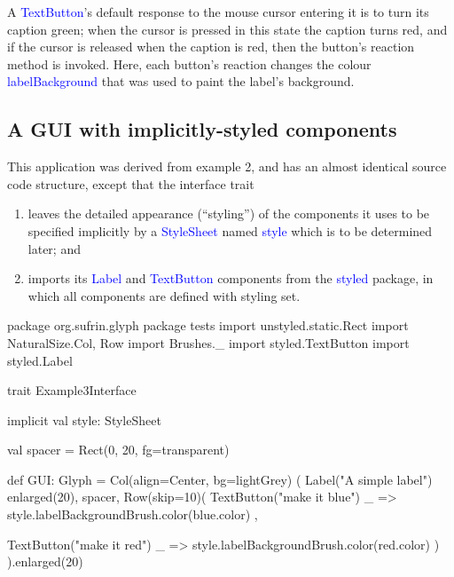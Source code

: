 \documentclass[12pt,a4paper]{article}
\def\Scala#1{\textcolor{blue}{\textsf{#1}}}
\def\SS#1{\subsection{#1}}
\begin{document}
A \Scala{TextButton}'s default response to the mouse cursor entering
it is to turn its caption green; when the cursor is pressed in this
state the caption turns red, and if the cursor is released when the
caption is red, then the button's reaction method is invoked. Here,
each button's reaction changes the colour \Scala{labelBackground} that
was used to paint the label's background.

\begin{center}
\end{center}


\clearpage
\SS{A GUI with implicitly-styled components}

This application was derived from example 2, and has an almost
identical source code structure, except that the interface trait
\begin{enumerate}
\item leaves the detailed appearance (``styling'') of the
      components it uses to be specified implicitly by a
      \Scala{StyleSheet} named \Scala{style}
      which is to be determined later; and
\item imports its \Scala{Label} and \Scala{TextButton}
      components from the \Scala{styled} package, in which
      all components are defined with styling set. 
\end{enumerate}

\begin{scala}
package org.sufrin.glyph
package tests
import unstyled.static.Rect
import NaturalSize.{Col, Row}
import Brushes._
import styled.TextButton
import styled.Label
\end{scala}

\begin{scala}
trait Example3Interface {
  implicit val style: StyleSheet

  val spacer = Rect(0, 20, fg=transparent)

  def GUI: Glyph = Col(align=Center, bg=lightGrey) (
    Label("A simple label") enlarged(20),
    spacer,
    Row(skip=10)(
      TextButton("make it blue")
      { _ => style.labelBackgroundBrush.color(blue.color) },

      TextButton("make it red")
      { _ => style.labelBackgroundBrush.color(red.color) }
    )
  ).enlarged(20)

}
\end{scala}
\end{document}
